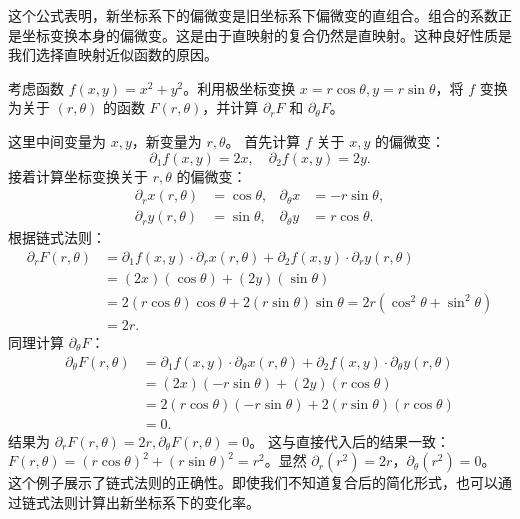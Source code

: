 \documentclass[12pt,UTF8]{ctexbook}
\begin{document}
这个公式表明，新坐标系下的偏微变是旧坐标系下偏微变的直组合。组合的系数正是坐标变换本身的偏微变。这是由于直映射的复合仍然是直映射。这种良好性质是我们选择直映射近似函数的原因。

\begin{et}
考虑函数 $f(x, y) = x^2 + y^2$。利用极坐标变换 $x = r \cos \theta, y = r \sin \theta$，将 $f$ 变换为关于 $(r, \theta)$ 的函数 $F(r, \theta)$，并计算 $\partial_r F$ 和 $\partial_\theta F$。
\end{et}
\begin{so}
这里中间变量为 $x, y$，新变量为 $r, \theta$。
首先计算 $f$ 关于 $x, y$ 的偏微变：
$$ \partial_1 f(x, y) = 2x, \quad \partial_2 f(x, y) = 2y. $$
接着计算坐标变换关于 $r, \theta$ 的偏微变：
\begin{align*}
\partial_r x(r,\theta) &= \cos \theta, & \partial_\theta x &= -r \sin \theta, \\
\partial_r y(r,\theta) &= \sin \theta, & \partial_\theta y &= r \cos \theta.
\end{align*}
根据链式法则：
\begin{align*}
\partial_r F(r,\theta) &= \partial_1 f(x, y) \cdot \partial_r x(r,\theta) + \partial_2 f(x, y) \cdot \partial_r y(r,\theta) \\
&= (2x)(\cos \theta) + (2y)(\sin \theta) \\
&= 2(r \cos \theta)\cos \theta + 2(r \sin \theta)\sin \theta = 2r (\cos^2 \theta + \sin^2 \theta) \\
&= 2r.
\end{align*}
同理计算 $\partial_\theta F$：
\begin{align*}
\partial_\theta F(r,\theta) &= \partial_1 f(x, y) \cdot \partial_\theta x(r,\theta) + \partial_2 f(x, y) \cdot \partial_\theta y(r,\theta) \\
&= (2x)(-r \sin \theta) + (2y)(r \cos \theta) \\
&= 2(r \cos \theta)(-r \sin \theta) + 2(r \sin \theta)(r \cos \theta) \\
&= 0.
\end{align*}
结果为 $\partial_r F(r,\theta) = 2r, \partial_\theta F(r,\theta) = 0$。
这与直接代入后的结果一致：$F(r, \theta) = (r \cos \theta)^2 + (r \sin \theta)^2 = r^2$。显然 $\partial_r (r^2) = 2r$，$\partial_\theta (r^2) = 0$。
这个例子展示了链式法则的正确性。即使我们不知道复合后的简化形式，也可以通过链式法则计算出新坐标系下的变化率。
\end{so}
\end{document}
